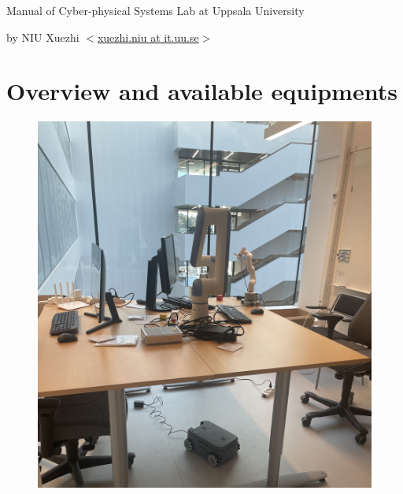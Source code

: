 \documentclass[hidelinks]{article}
\begin{document}
\vspace*{-5em}
\begin{center}
    \begin{huge}
        Manual of Cyber-physical Systems Lab at Uppsala University\\
    \end{huge}
    \vspace{15pt}
    \begin{large}
        by NIU Xuezhi $<$\href{mailto:xuezhi.niu@it.uu.se}{xuezhi.niu at it.uu.se}$>$
    \end{large}
\end{center}
\vspace*{-1em}

\setlength{\parskip}{13pt plus2pt}
\section*{Overview and available equipments}

\begin{figure}
    \begin{center}
        \includegraphics[width=\linewidth]{Figures/MainPhoto.jpeg}
    \end{center}
\end{figure}
\end{document}
